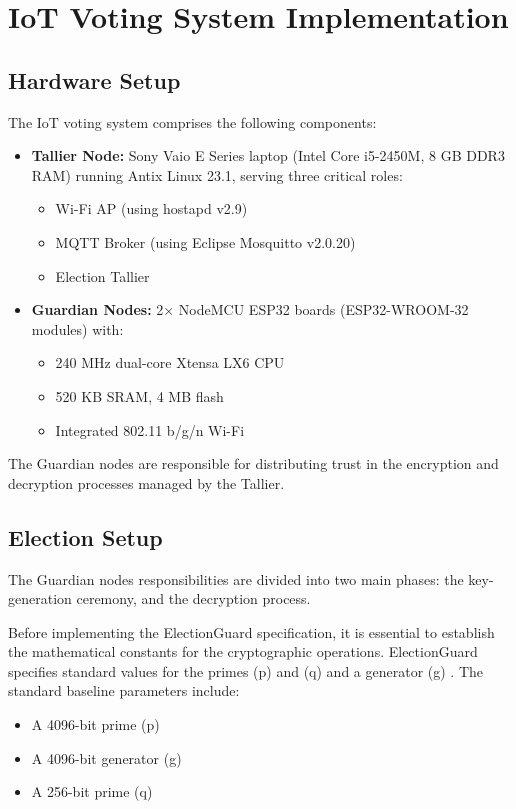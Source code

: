 \chapter{\ac{IoT} Voting System Implementation} \label{chap:implementation}
\section{Hardware Setup}
The \ac{IoT} voting system comprises the following components:
\begin{itemize}
    \item \textbf{Tallier Node:} Sony Vaio E Series laptop (Intel Core i5-2450M, 8 GB DDR3 RAM) running Antix Linux 23.1, serving three critical roles:
    \begin{itemize}
        \item Wi-Fi \ac{AP} (using hostapd v2.9)
        \item MQTT Broker (using Eclipse Mosquitto v2.0.20)
        \item Election Tallier
    \end{itemize}
    \item \textbf{Guardian Nodes:} 2× NodeMCU ESP32 boards (ESP32-WROOM-32 modules) with:
    \begin{itemize}
        \item 240 MHz dual-core Xtensa LX6 CPU
        \item 520 KB SRAM, 4 MB flash
        \item Integrated 802.11 b/g/n Wi-Fi
    \end{itemize}
\end{itemize}
The Guardian nodes are responsible for distributing trust in the encryption and decryption processes managed by the Tallier. 

\section{Election Setup} \label{sec:constants}
The Guardian nodes responsibilities are divided into two main phases: the key-generation ceremony, and the decryption process.

Before implementing the ElectionGuard specification, it is essential to establish the mathematical constants for the cryptographic operations. ElectionGuard specifies standard values for the primes (p) and (q) and a generator (g) \cite[21]{eg-spec}. The standard baseline parameters include:
\begin{itemize}
    \item A 4096-bit prime (p) \cite[22]{eg-spec}
    \item A 4096-bit generator (g) \cite[23]{eg-spec}
    \item A 256-bit prime (q) \cite[21]{eg-spec}
\end{itemize}

